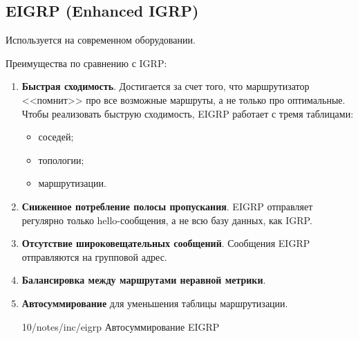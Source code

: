 \subsection{EIGRP (Enhanced IGRP)}

Используется на современном оборудовании.

Преимущества по сравнению с IGRP:

\begin{enumerate}
    \item \textbf{Быстрая сходимость}. Достигается за счет того, что маршрутизатор <<помнит>> про все возможные маршруты, а не только про оптимальные. Чтобы реализовать быструю сходимость, EIGRP работает с тремя таблицами:

          \begin{itemize}
              \item соседей;
              \item топологии;
              \item маршрутизации.
          \end{itemize}
    \item \textbf{Сниженное потребление полосы пропускания}. EIGRP отправляет регулярно только hello-сообщения, а не всю базу данных, как IGRP.
    \item \textbf{Отсутствие широковещательных сообщений}. Сообщения EIGRP отправляются на групповой адрес.
    \item \textbf{Балансировка между маршрутами неравной метрики}.
    \item \textbf{Автосуммирование} для уменьшения таблицы маршрутизации.

          \image
          {\linewidth}
          {10/notes/inc/eigrp}
          {Автосуммирование EIGRP}
\end{enumerate}